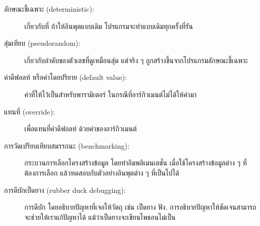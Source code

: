 \begin{description}


\item[ลักษณะชี้เฉพาะ (deterministic):]
เกี่ยวกับที่ ถ้าให้อินพุตแบบเดิม โปรแกรมจะทำแบบเดิมทุกครั้งที่รัน


\item[สุ่มเทียบ (pseudorandom):]
เกี่ยวกับลำดับของตัวเลขที่ดูเหมือนสุ่ม
แต่จริง ๆ ถูกสร้างขึ้นจากโปรแกรมลักษณะชี้เฉพาะ


\item[ค่าดีฟอลท์ หรือค่าโดยปริยาย (default value):]
ค่าที่ให้ไว้เป็นสำหรับพารามิเตอร์ ในกรณีที่อาร์กิวเมนต์ไม่ได้ให้ค่ามา


\item[แทนที่ (override):] 
เพื่อแทนที่ค่าดีฟอลท์ ด้วยค่าของอาร์กิวเมนต์



\item[การวัดเปรียบเทียบสมรรถนะ (benchmarking):] 
กระบวนการเลือกโครงสร้างข้อมูล
โดยทำอิมพลิเมนเตชั่น เมื่อใช้โครงสร้างข้อมูลต่าง ๆ ที่ต้องการเลือก
แล้วทดสอบกับตัวอย่างอินพุตต่าง ๆ ที่เป็นไปได้



\item[การดีบักเป็ดยาง (rubber duck debugging):] 
การดีบัก โดยอธิบายปัญหาที่เจอให้วัตถุ เช่น เป็ดยาง ฟัง.
การอธิบายปัญหาให้ชัดเจนสามารถจะช่วยให้เราแก้ปัญหาได้ แม้ว่าเป็ดยางจะเขียนไพธอนไม่เป็น


\end{description}


